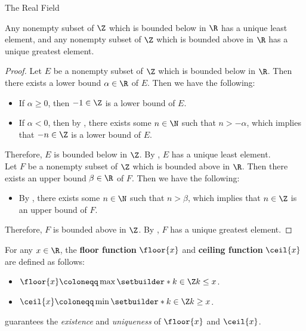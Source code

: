 \begin{section}{The Real Field}
\bigskip

\begin{theorem} \label{thm:BoundedSubsetOfZInRHasExtremum}
    Any nonempty subset of $\Z$ which is bounded below in $\R$ has a unique least element,
    and any nonempty subset of $\Z$ which is bounded above in $\R$ has a unique greatest element.
\end{theorem}

\begin{proof}
    Let $E$ be a nonempty subset of $\Z$ which is bounded below in $\R$. Then there exists a lower bound $\alpha \in \R$
    of $E$. Then we have the following:
    \begin{itemize}
        \item If $\alpha \geq 0$, then $-1 \in \Z$ is a lower bound of $E$.
        \item If $\alpha < 0$, then by , there exists some $n \in \N$
        such that $n > - \alpha$, which implies that $-n \in \Z$ is a lower bound of $E$.
    \end{itemize}
    Therefore, $E$ is bounded below in $\Z$. By , $E$ has a unique least element.
    \\[6mm]
    Let $F$ be a nonempty subset of $\Z$ which is bounded above in $\R$. Then there exists an upper bound $\beta \in \R$
    of $F$. Then we have the following:
    \begin{itemize}
        \item By , there exists some $n \in \N$
        such that $n > \beta$, which implies that $n \in \Z$ is an upper bound of $F$.
    \end{itemize}
    Therefore, $F$ is bounded above in $\Z$. By , $F$ has a unique greatest element.
\end{proof}

\bigskip

\begin{definition} \label{def:FloorCeilingFunctions}
    For any $x \in \R$, the \textbf{floor function} $\floor{x}$
    and \textbf{ceiling function} $\ceil{x}$ are defined as follows:
    \begin{itemize}
        \item $\floor{x} \coloneqq \max\setbuilder*{k \in \Z}{k \leq x}$.
        \item $\ceil{x} \coloneqq \min\setbuilder*{k \in \Z}{k \geq x}$.
    \end{itemize}
     guarantees the
    \emph{existence} and \emph{uniqueness} of $\floor{x}$ and $\ceil{x}$.
\end{definition}


\end{section}
